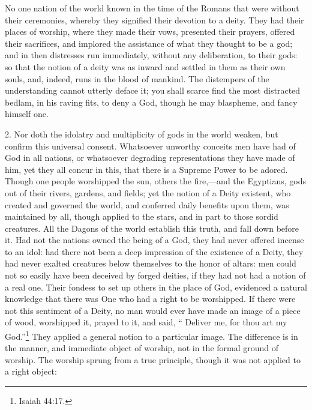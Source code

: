 \documentclass[a5paper]{book}
\begin{document}
No one nation of the world known in the time of the Romans 
    that were without their ceremonies,
    whereby they signified their devotion to a deity. 
They had their places of worship, 
    where they made their vows, 
    presented their prayers, 
    offered their sacrifices, 
    and implored the assistance of what they thought to be a god; 
    and in then distresses run immediately,
    without any deliberation, to their gods: 
    so that the notion of a deity was as inward and settled in them 
    as their own souls, and, indeed, runs in the blood of mankind. 
The distempers of the understanding cannot utterly deface it; 
    you shall scarce find the most distracted bedlam, 
    in his raving fits, to deny a God, 
    though he may blaspheme, and fancy himself one.

2. Nor doth the idolatry and multiplicity of gods in the world weaken, %
    but confirm this universal consent. 
Whatsoever unworthy conceits men have had of God in all nations, 
    or whatsoever degrading representations they have made of him, 
    yet they all concur in this, 
    that there is a Supreme Power to be adored. 
Though one people worshipped the sun, others the fire,---and the Egyptians, 
    gods out of their rivers, gardens, and fields; 
    yet the notion of a Deity existent, 
    who created and governed the world, 
    and conferred daily benefits upon them, 
    was maintained by all, 
    though applied to the stars, 
    and in part to those sordid creatures. 
All the Dagons of the world establish this truth, 
    and fall down before it.
Had not the nations owned the being of a God, 
    they had never offered incense to an idol: 
    had there not been a deep impression of the existence of a Deity, 
    they had never exalted creatures below themselves 
    to the honor of altars: 
    men could not so easily have been deceived by forged deities, 
    if they had not had a notion of a real one. 
Their fondess to set up others in the place of God, 
    evidenced a natural knowledge that there was One 
    who had a right to be worshipped.
If there were not this sentiment of a Deity, 
    no man would ever have made an image of a piece of wood, 
    worshipped it, prayed to it, and said, 
    “ Deliver me, for thou art my God.”\footnote{Isaiah 44:17.} 
They applied a general notion to a particular image. 
The difference is in the manner, 
    and immediate object of worship, 
    not in the formal ground of worship.
The worship sprung from a true principle, 
    though it was not applied to a right object: 
\end{document}
